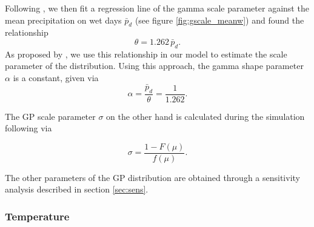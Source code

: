 \begin{refsection}
Following \cite{GengDevriesSupit1986}, we then fit a regression line of the gamma scale parameter against the mean precipitation on wet days $\bar{p}_d$ (see figure \ref{fig:gscale_meanw}) and found the relationship
\begin{equation}
\theta = 1.262\, \bar{p}_d. \label{eq:gamma_scale}
\end{equation}
As proposed by \cite{GengDevriesSupit1986}, we use this relationship in our model to estimate the scale parameter of the distribution. Using this approach, the gamma shape parameter $\alpha$ is a constant, given via
\begin{equation}
\alpha = \frac{\bar{p}_d}{\theta} = \frac{1}{1.262}. \label{eq:gamma_shape}
\end{equation}

The GP scale parameter $\sigma$ on the other hand is calculated during the simulation following \cite{NeykovNeytchevZucchini2014} via

\begin{equation}
\sigma = \frac{1 - F(\mu)}{f(\mu)}. \label{eq:gp_scale}
\end{equation}

The other parameters of the GP distribution are obtained through a sensitivity analysis described in section \ref{sec:sens}.

\subsubsection{Temperature}


\end{refsection}
